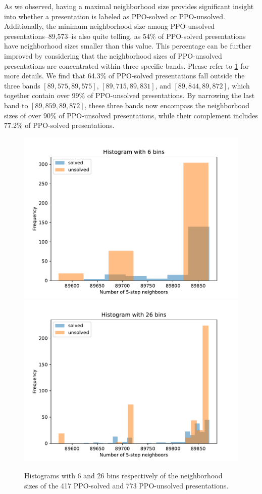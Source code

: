 As we observed, having a maximal neighborhood size provides significant insight into whether a presentation is labeled as PPO-solved or PPO-unsolved.
Additionally, the minimum neighborhood size among PPO-unsolved presentations--89,573--is also quite telling, as 54\% of PPO-solved presentations have neighborhood sizes smaller than this value.
This percentage can be further improved by considering that the neighborhood sizes of PPO-unsolved presentations are concentrated within three specific bands.
Please refer to \cref{fig:prime_histogram} for more details.
We find that 64.3\% of PPO-solved presentations fall outside the three bands \([89,575, 89,575]\), \([89,715, 89,831]\), and \([89,844, 89,872]\), which together contain over 99\% of PPO-unsolved presentations.
By narrowing the last band to \([89,859, 89,872]\), these three bands now encompass the neighborhood sizes of over 90\% of PPO-unsolved presentations, while their complement includes 77.2\% of PPO-solved presentations.

\begin{figure}
	\centering
	\includegraphics[scale=.34]{fig/prime_histogram_rl.pdf}
	\includegraphics[scale=.34]{fig/prime_histogram_rl2.pdf}
	\caption{Histograms with 6 and 26 bins respectively of the neighborhood sizes of the 417 PPO-solved and 773 PPO-unsolved presentations.}
	\label{fig:prime_histogram}
\end{figure}



